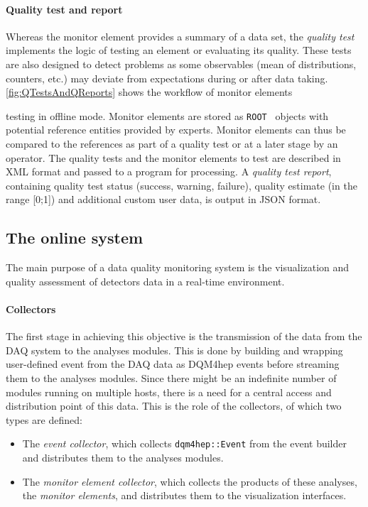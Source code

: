 \documentclass{webofc}
\begin{document}
{\paragraph{Quality test and report}

Whereas the monitor element provides a summary of a data set, the \textit{quality test} implements the logic of testing an element or evaluating its quality.
These tests are also designed to detect problems as some observables (mean of distributions, counters, etc.) may deviate from expectations during or after data taking. \autoref{fig:QTestsAndQReports} shows the workflow of monitor elements

} %
\noindent testing in offline mode.
Monitor elements are stored as \texttt{ROOT}~\cite{ROOT} objects with potential reference entities provided by experts.
Monitor elements can thus be compared to the references as part of a quality test or at a later stage by an operator.
The quality tests and the monitor elements to test are described in XML format and passed to a program for processing.
A \textit{quality test report}, containing quality test status (success, warning, failure), quality estimate (in the range [0;1]) and additional custom user data, is output in JSON format.

\subsection{The online system}
\label{subsec:online}
The main purpose of a data quality monitoring system is the visualization and quality assessment of detectors data in a real-time environment.

\paragraph{Collectors}\label{par:Collectors}
The first stage in achieving this objective is the transmission of the data from the DAQ system to the analyses modules.
This is done by building and wrapping user-defined event from the DAQ data as DQM4hep events before streaming them to the analyses modules.
Since there might be an indefinite number of modules running on multiple hosts, there is a need for a central access and distribution point of this data. This is the role of the collectors, of which two types are defined:

\begin{itemize}
  \item The \textit{event collector}, which collects \texttt{dqm4hep::Event} from the event builder and distributes them to the analyses modules.
  \item The \textit{monitor element collector}, which collects the products of these analyses, the \textit{monitor elements}, and distributes them to the visualization interfaces.
\end{itemize}
\end{document}

